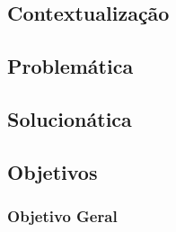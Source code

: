







\subsection*{Contextualização}

\subsection*{Problemática}

\subsection*{Solucionática}

\subsection*{Objetivos}

\subsubsection*{Objetivo Geral}

